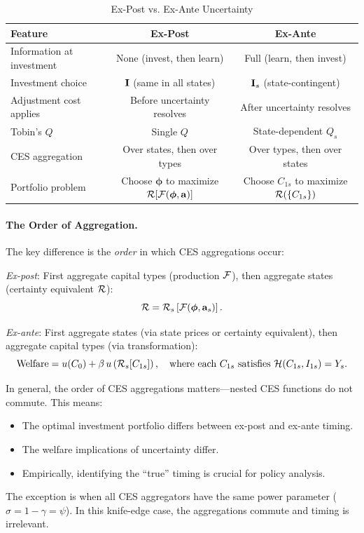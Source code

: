 \begin{table}[H]
\centering
\caption{Ex-Post vs. Ex-Ante Uncertainty}
\label{tab:ac-risk-comparison}
\renewcommand{\arraystretch}{1.5}
\begin{tabular}{@{}lcc@{}}
\toprule
\textbf{Feature} & \textbf{Ex-Post} & \textbf{Ex-Ante} \\
\midrule
Information at investment & None (invest, then learn) & Full (learn, then invest) \\
Investment choice & $\mathbf{I}$ (same in all states) & $\mathbf{I}_s$ (state-contingent) \\
Adjustment cost applies & Before uncertainty resolves & After uncertainty resolves \\
Tobin's $Q$ & Single $Q$ & State-dependent $Q_s$ \\
CES aggregation & Over states, then over types & Over types, then over states \\
Portfolio problem & Choose $\boldsymbol{\phi}$ to maximize $\mathcal{R}[\mathcal{F}(\boldsymbol{\phi}, \mathbf{a})]$ & Choose $C_{1s}$ to maximize $\mathcal{R}(\{C_{1s}\})$ \\
\bottomrule
\end{tabular}
\end{table}

\paragraph{The Order of Aggregation.}
The key difference is the \emph{order} in which CES aggregations occur:

\medskip
\noindent
\textit{Ex-post}: First aggregate capital types (production $\mathcal{F}$), then aggregate states (certainty equivalent $\mathcal{R}$):
\[
\mathcal{R} = \mathcal{R}_s\left[ \mathcal{F}(\boldsymbol{\phi}, \mathbf{a}_s) \right].
\]

\medskip
\noindent
\textit{Ex-ante}: First aggregate states (via state prices or certainty equivalent), then aggregate capital types (via transformation):
\[
\text{Welfare} = u(C_0) + \beta \, u\left( \mathcal{R}_s[C_{1s}] \right), \quad \text{where each } C_{1s} \text{ satisfies } \mathcal{H}(C_{1s}, I_{1s}) = Y_s.
\]

\begin{calloutimportant}
In general, the order of CES aggregations matters---nested CES functions do not commute. This means:
\begin{itemize}[nosep]
\item The optimal investment portfolio differs between ex-post and ex-ante timing.
\item The welfare implications of uncertainty differ.
\item Empirically, identifying the ``true'' timing is crucial for policy analysis.
\end{itemize}

The exception is when all CES aggregators have the same power parameter ($\sigma = 1 - \gamma = \psi$). In this knife-edge case, the aggregations commute and timing is irrelevant.
\end{calloutimportant}


